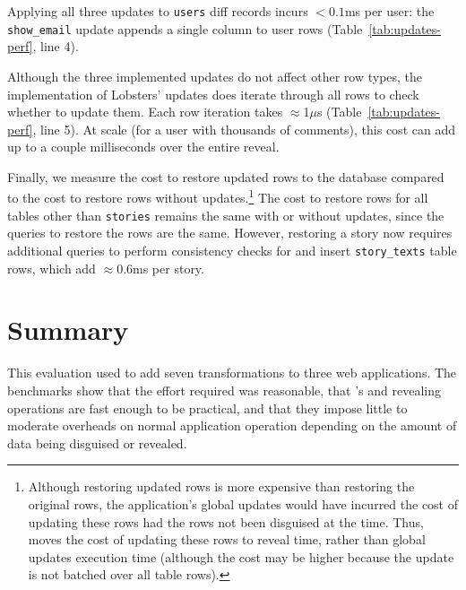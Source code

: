 %
Applying all three updates to \texttt{users} diff records incurs $<0.1$ms per
user: the \texttt{show\_email} update appends a single column to user rows
(Table~\ref{tab:updates-perf}, line 4).
%

%
Although the three implemented updates do not affect other row types, the
implementation of Lobsters' updates does iterate through all rows to check
whether to update them. Each row iteration takes $\approx$1$\mu$s (Table~\ref{tab:updates-perf}, line 5). At scale (\eg for a user with thousands
of comments), this cost can add up to a couple milliseconds over the entire
reveal.
%

Finally, we measure the cost to restore updated rows to the database compared to
the cost to restore rows without updates.\footnote{Although restoring updated
rows is more expensive than restoring the original rows, the application's
global updates would have incurred the cost of updating these rows had the rows not
been disguised at the time. Thus, \sys moves the cost of updating these rows to
reveal time, rather than global updates execution time (although the cost may be higher
because the update is not batched over all table rows).}
%
The cost to restore rows for all tables other than \texttt{stories} remains the
same with or without updates, since the queries to restore the rows are the
same.  However, restoring a story now requires additional queries to perform
consistency checks for and insert \texttt{story\_texts} table rows, which add 
$\approx$0.6ms per story.
%

%
\section{Summary} 
This evaluation used \sys to add seven \xxing transformations to three web
applications. The benchmarks show that the effort required was reasonable, that
\sys's \xxing and revealing operations are fast enough to be practical, and that
they impose little to moderate overheads on normal application operation
depending on the amount of data being disguised or revealed.
%
